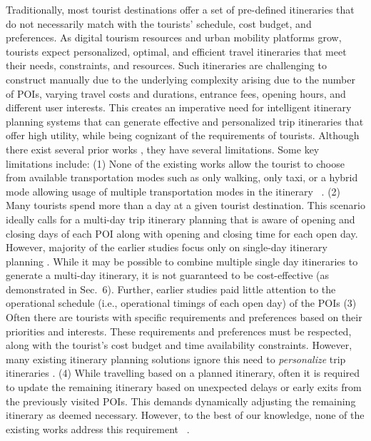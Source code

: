 Traditionally, most tourist destinations offer a set of pre-defined itineraries that do not necessarily match with the tourists' schedule, cost budget, and preferences. As digital tourism resources and urban mobility platforms grow, tourists expect personalized, optimal, and efficient travel itineraries that meet their needs, constraints, and resources. Such itineraries are challenging to construct manually due to the underlying complexity arising due to the number of POIs, varying travel costs and durations, entrance fees, opening hours, and different user interests. This creates an imperative need for intelligent itinerary planning systems that can generate effective and personalized trip itineraries that offer high utility, while being cognizant of the requirements of tourists. Although there exist several prior works \cite{chen2014automatic, vanzelst2016itinerary, taylor2018tour, vu2022branch, panagiotakis2024expectation, liu2024personalized, rambha2024optimized, lim2018personalized, bolzoni2014efficient}, they have several limitations. Some key limitations include: (1) None of the existing works allow the tourist to choose from available transportation modes such as only walking, only taxi, or a hybrid mode allowing usage of multiple transportation modes in the itinerary ~\cite{chen2014automatic, taylor2018tour, vanzelst2016itinerary}. (2) Many tourists spend more than a day at a given tourist destination. This scenario ideally calls for a multi-day trip itinerary planning that is aware of opening and closing days of each POI along with opening and closing time for each open day. However, majority of the earlier studies focus only on single-day itinerary planning \cite{taylor2018tour, vu2022branch, panagiotakis2024expectation}.  While it may be possible to combine multiple single day itineraries to generate a multi-day itinerary, it is not guaranteed to be cost-effective (as demonstrated in Sec.~6). Further, earlier studies paid little attention to the operational schedule (i.e., operational timings of each open day) of the POIs \cite{chen2014automatic, vanzelst2016itinerary, taylor2018tour} (3) Often there are tourists with specific requirements and preferences based on their priorities and interests. These requirements and preferences must be respected, along with the tourist's cost budget and time availability constraints. However, many existing itinerary planning solutions ignore this need to \emph{personalize} trip itineraries \cite{rambha2024optimized, yu2017mining, rani2018development, yu2014optimal}. (4) While travelling based on a planned itinerary, often it is required to update the remaining itinerary based on unexpected delays or early exits from the previously visited POIs. This demands dynamically adjusting the remaining itinerary as deemed necessary. However, to the best of our knowledge, none of the existing works address this requirement ~\cite{chen2014automatic, taylor2018tour, vanzelst2016itinerary}.


